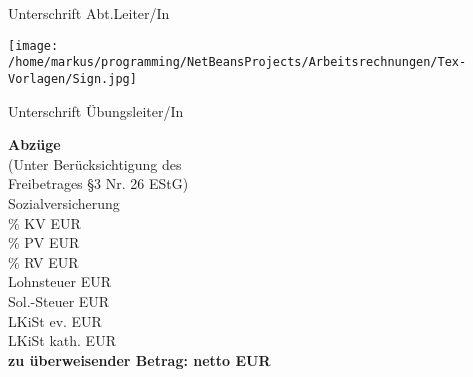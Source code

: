 \documentclass[a4paper,10pt,BCOR=0mm]{scrreprt}
\begin{document}
\begin{center}
\parbox{6cm}{
\vspace{9mm}
\begin{center}
Unterschrift Abt.Leiter/In
\end{center}
\vspace{9mm}
\texttt{[image: /home/markus/programming/NetBeansProjects/Arbeitsrechnungen/Tex-Vorlagen/Sign.jpg]}
\begin{center}
Unterschrift Übungsleiter/In
\end{center}
}
\hfill
\parbox{0.45\textwidth }{
\begin{small}\textbf{Abzüge}\hfill \hspace*{2cm}\\
(Unter Berücksichtigung des\hfill \hspace*{2cm}\\
Freibetrages \S 3 Nr. 26 EStG)\hfill \hspace*{2cm}\\
\hspace*{2cm} Sozialversicherung \hfill \hspace*{2cm}\\
\hspace*{2cm} \% KV \hfill  EUR \hspace*{2cm} \\
\hspace*{2cm} \% PV \hfill  EUR \hspace*{2cm} \\
\hspace*{2cm} \% RV \hfill  EUR \hspace*{2cm} \\
Lohnsteuer  \hfill \hfill EUR \hspace*{2cm} \\
Sol.-Steuer  \hfill \hfill EUR \hspace*{2cm} \\
LKiSt ev. \hfill \hfill EUR \hspace*{2cm} \\
LKiSt kath. \hfill \hfill EUR \hspace*{2cm} \\
\hfill*\textbf{zu überweisender Betrag: netto EUR} \hspace*{2cm}\\
\end{small}}
\end{center}
\end{document}
